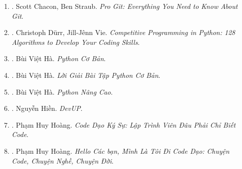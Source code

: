 \documentclass{article}
\begin{document}
\begin{enumerate}
\begin{itemize}
		\item ``A data structure is a way to store \& organize data in order to facilitate access \& modifications.''
		\item ``Machine learning can be thought of as a method for performing algorithmic tasks without explicitly designing an algorithm, but instead inferring patterns from data \& thereby automatically learning a solution.''
		\item ``The running time of an algorithm on a particular input is the number of instructions \& data accesses executed.''
	\end{itemize}
	{\sf About the Author.} {\sc Thomas H. Cormen} is Emeritus Professor of Computer Science at Dartmouth College. {\sc Charles E. Leiserson} is Edwin Sibley Webster Professor in Electrical Engineering \& Computer Science at MIT. {\sc Ronald L. Rivest} is Institute Professor at MIT. {\sc Clifford Stein} is Wai T. Chang Professor of Industrial Engineering \& Operations Research, \& of Computer Science at Columbia University.
	
	\item \cite{Chacon_Straub2014}. Scott Chacon, Ben Straub. {\it Pro Git: Everything You Need to Know About Git}.\hfill{\sf[reading]}
	
	\item \cite{Durr_Vie2021}. Christoph D\"urr, Jill-J\^enn Vie. {\it Competitive Programming in Python: 128 Algorithms to Develop Your Coding Skills}.
	
	\item \cite{Ha_Python_co_ban}. Bùi Việt Hà. {\it Python Cơ Bản}.\hfill{\sf[done]}
	
	\item \cite{Ha_loi_giai_BT_Python_co_ban}. Bùi Việt Hà. {\it Lời Giải Bài Tập Python Cơ Bản}.\hfill{\sf[reading]}
	
	\item \cite{Ha_Python_nang_cao}. Bùi Việt Hà. {\it Python Nâng Cao}.\hfill{\sf[done]}
	
	\item \cite{Hien_DevUp}. Nguyễn Hiền. {\it DevUP}.\hfill{\sf[done]}
	
	\item \cite{Hoang_code_dao_ky_su}. Phạm Huy Hoàng. {\it Code Dạo Ký Sự: Lập Trình Viên Đâu Phải Chỉ Biết Code}.\hfill{\sf[done]}
	
	\item \cite{Hoang_toi_di_code_dao}. Phạm Huy Hoàng. {\it Hello Các bạn, Mình Là Tôi Đi Code Dạo: Chuyện Code, Chuyện Nghề, Chuyện Đời}.\hfill{\sf[done]}
	

\end{enumerate}
\end{document}
